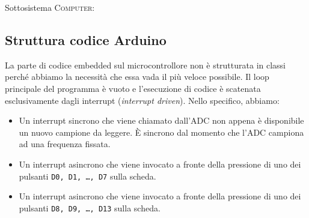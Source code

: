 \documentclass[a4paper,11pt]{article}
\begin{document}
\vspace{2mm}

\noindent
Sottosistema \textsc{Computer}:

\vspace{3mm}


\subsection{Struttura codice Arduino}
La parte di codice embedded sul microcontrollore non è strutturata in classi perché abbiamo la necessità che essa vada il più veloce possibile. Il loop principale del programma è vuoto e l'esecuzione di codice è scatenata esclusivamente dagli interrupt (\emph{interrupt driven}). Nello specifico, abbiamo:
\begin{itemize}
	\item Un interrupt sincrono che viene chiamato dall'ADC non appena è disponibile un nuovo campione da leggere. È sincrono dal momento che l'ADC campiona ad una frequenza fissata.
	\item Un interrupt asincrono che viene invocato a fronte della pressione di uno dei pulsanti \texttt{D0, D1, \dots, D7} sulla scheda.
	\item Un interrupt asincrono che viene invocato a fronte della pressione di uno dei pulsanti \texttt{D8, D9, \dots, D13} sulla scheda.
\end{itemize}
\end{document}
